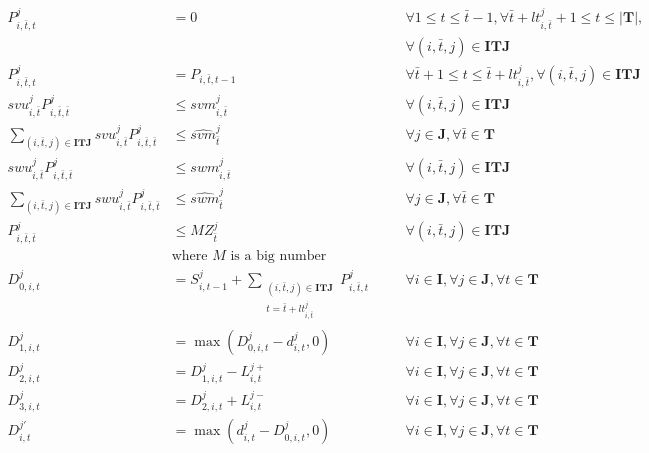 \documentclass[12pt,a4paper]{article}
\begin{document}
\begin{align}
P_{i,\bar{t},t}^{j} & = 0 && \quad \forall 1\leq t\leq \bar{t}-1, \forall \bar{t}+lt_{i,\bar{t}}^{j}+1 \leq t \leq |\textbf{T}|, \nonumber\\
& && \quad \forall (i,\bar{t},j)\in \textbf{ITJ} \\
P_{i,\bar{t},t}^{j} & = P_{i,\bar{t},t-1} && \quad \forall \bar{t}+1\leq t\leq \bar{t}+lt_{i,\bar{t}}^{j}, \forall (i,\bar{t},j)\in \textbf{ITJ} \\
svu_{i,\bar{t}}^{j}P_{i,\bar{t},\bar{t}}^{j} & \leq svm_{i,\bar{t}}^{j} && \quad \forall (i,\bar{t},j)\in \textbf{ITJ} \\
\sum_{(i,\bar{t},j)\in \textbf{ITJ} } svu_{i,\bar{t}}^{j}P_{i,\bar{t},\bar{t}}^{j} & \leq \widehat{svm}_{\bar{t}}^{j} && \quad \forall j\in \textbf{J}, \forall \bar{t} \in \textbf{T} \\
swu_{i,\bar{t}}^{j}P_{i,\bar{t},\bar{t}}^{j} & \leq swm_{i,\bar{t}}^{j} && \quad \forall (i,\bar{t},j)\in \textbf{ITJ} \\
\sum_{(i,\bar{t},j)\in \textbf{ITJ} } swu_{i,\bar{t}}^{j}P_{i,\bar{t},\bar{t}}^{j} & \leq \widehat{swm}_{\bar{t}}^{j} && \quad \forall j\in \textbf{J}, \forall \bar{t} \in \textbf{T} \\
P_{i,\bar{t},\bar{t}}^{j} & \leq M Z_{\bar{t}}^{j} && \quad \forall (i,\bar{t},j)\in \textbf{ITJ} \\
& \text{where } M \text{ is a big number} && \nonumber \\
D_{0,i,t}^{j} & = S_{i,t-1}^{j}+\sum_{
\begin{matrix} 
(i,\bar{t},j)\in \textbf{ITJ} \\
t=\bar{t}+lt_{i,\bar{t}}^{j}
\end{matrix}
}
P_{i,\bar{t},t}^{j} && \quad \forall i\in \textbf{I},\forall j\in \textbf{J}, \forall t \in \textbf{T} \\
D_{1,i,t}^{j} & = \max(D_{0,i,t}^{j}-d_{i,t}^{j},0) && \quad \forall i\in \textbf{I},\forall j\in \textbf{J}, \forall t \in \textbf{T} \label{eq:max1} \\
D_{2,i,t}^{j} & = D_{1,i,t}^{j}- L_{i,t}^{j{+}} && \quad \forall i\in \textbf{I},\forall j\in \textbf{J}, \forall t \in \textbf{T} \\
D_{3,i,t}^{j} & = D_{2,i,t}^{j}+ L_{i,t}^{j{-}} && \quad \forall i\in \textbf{I},\forall j\in \textbf{J}, \forall t \in \textbf{T} \\
D_{i,t}^{j{'}} & = \max(d_{i,t}^{j}-D_{0,i,t}^{j},0) && \quad \forall i\in \textbf{I},\forall j\in \textbf{J}, \forall t \in \textbf{T} \label{eq:max2}\\

\end{align}
\end{document}
